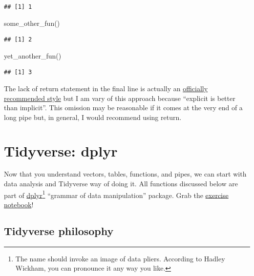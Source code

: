 \documentclass[
]{book}
\newenvironment{Shaded}{\begin{snugshade}}{\end{snugshade}}
\newcommand{\FunctionTok}[1]{\textcolor[rgb]{0.00,0.00,0.00}{#1}}
\newcommand{\NormalTok}[1]{#1}
\begin{document}
\begin{verbatim}
## [1] 1
\end{verbatim}

\begin{Shaded}
\begin{Highlighting}[]
\FunctionTok{some\_other\_fun}\NormalTok{()}
\end{Highlighting}
\end{Shaded}

\begin{verbatim}
## [1] 2
\end{verbatim}

\begin{Shaded}
\begin{Highlighting}[]
\FunctionTok{yet\_another\_fun}\NormalTok{()}
\end{Highlighting}
\end{Shaded}

\begin{verbatim}
## [1] 3
\end{verbatim}

The lack of return statement in the final line is actually an \href{https://style.tidyverse.org/functions.html}{officially recommended style} but I am vary of this approach because ``explicit is better than implicit''. This omission may be reasonable if it comes at the very end of a long pipe but, in general, I would recommend using return.

\hypertarget{dplyr}{%
\chapter{Tidyverse: dplyr}\label{dplyr}}

Now that you understand vectors, tables, functions, and pipes, we can start with data analysis and Tidyverse way of doing it. All functions discussed below are part of \href{https://dplyr.tidyverse.org/}{dplyr}\footnote{The name should invoke an image of data pliers. According to Hadley Wickham, you can pronounce it any way you like.} ``grammar of data manipulation'' package. Grab the \href{notebooks/Seminar\%2006\%20-\%20dplyr.Rmd}{exercise notebook}!

\hypertarget{tidyverse-philosophy}{%
\section{Tidyverse philosophy}\label{tidyverse-philosophy}}
\end{document}
